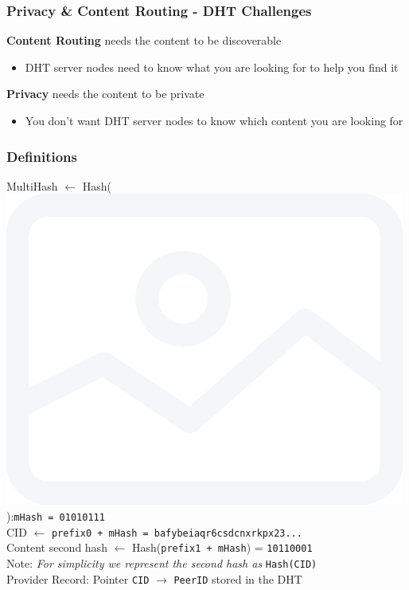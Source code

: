\documentclass{pl-slide}
\begin{document}
\begin{frame}
\frametitle{Privacy \& Content Routing - DHT Challenges}
\begin{itemize}
	\itemc \textbf{Content Routing} needs the content to be discoverable
	\begin{itemize}
		\item[\greencube] DHT server nodes need to know what you are looking for to help you find it
	\end{itemize}
		\bigskip
	\itemc \textbf{Privacy} needs the content to be private
	\begin{itemize}
		\item[\greencube] You don't want DHT server nodes to know which content you are looking for
	\end{itemize}

\end{itemize}
\end{frame}


\begin{frame}
\frametitle{Definitions}
{\Large
	MultiHash $\leftarrow$ Hash(\includegraphics[scale=0.03]{resources/image.png}):\hspace{1em}\texttt{mHash = 01010111}\\
	CID $\leftarrow$ \texttt{prefix0 + mHash = bafybeiaqr6csdcnxrkpx23...}\\
	Content second hash $\leftarrow$ Hash(\texttt{prefix1 + mHash}) = \texttt{10110001}\\
	\smallskip
	{\large\qquad\yellowcube\thinspace Note: \textit{For simplicity we represent the second hash as} \texttt{Hash(CID)}}\\
	\medskip
	Provider Record: Pointer \texttt{CID} $\rightarrow$ \texttt{PeerID} stored in the DHT
}


\end{frame}
\end{document}
